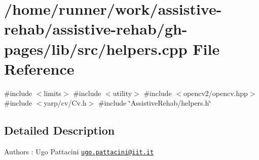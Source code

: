 \section{/home/runner/work/assistive-\/rehab/assistive-\/rehab/gh-\/pages/lib/src/helpers.cpp File Reference}
\label{helpers_8cpp}
{\ttfamily \#include $<$limits$>$}\newline
{\ttfamily \#include $<$utility$>$}\newline
{\ttfamily \#include $<$opencv2/opencv.\+hpp$>$}\newline
{\ttfamily \#include $<$yarp/cv/\+Cv.\+h$>$}\newline
{\ttfamily \#include \char`\"{}Assistive\+Rehab/helpers.\+h\char`\"{}}\newline


\subsection{Detailed Description}
\begin{DoxyAuthor}{Authors}
\+: Ugo Pattacini \href{mailto:ugo.pattacini@iit.it}{\tt ugo.\+pattacini@iit.\+it} 
\end{DoxyAuthor}
